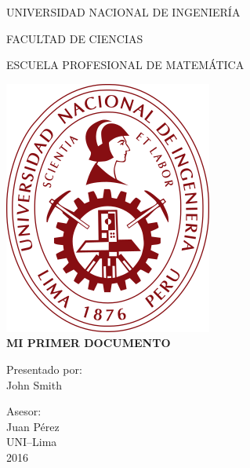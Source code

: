 \documentclass{report}
\begin{document}
\begin{titlepage}
\centering
{
\Large UNIVERSIDAD NACIONAL DE INGENIERÍA\\[5mm]
}

{
\large FACULTAD DE CIENCIAS\\[5mm]
}	

{
\large 	ESCUELA PROFESIONAL DE MATEMÁTICA\\[5mm]
}

\includegraphics[width=0.25\paperwidth]{logo}\\[8mm]

{
\LARGE\bfseries MI PRIMER DOCUMENTO\\[5mm]
}
	
	Presentado por:\\[5mm]
	
{
\large John Smith\\[5mm]
}

Asesor:\\[5mm]

Juan Pérez\\[5mm]
	
	UNI--Lima\\[5mm]
	
	2016
\end{titlepage}
\end{document}
